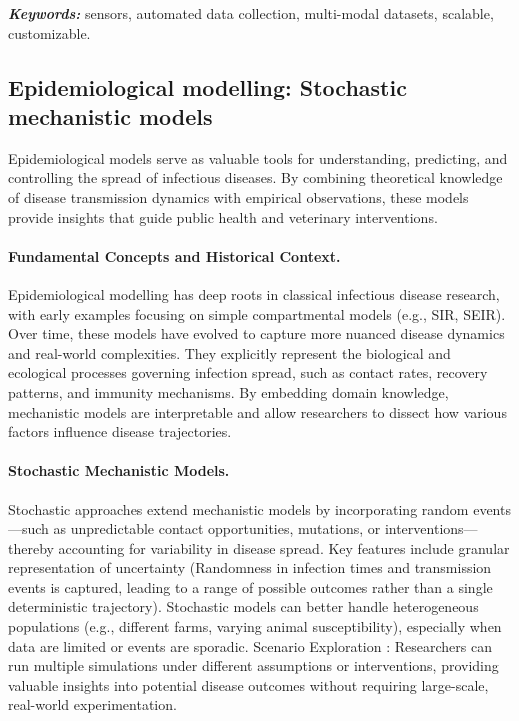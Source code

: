 \textit{\textbf{Keywords:}} sensors, automated data collection, multi-modal datasets, scalable, customizable.


\subsection{Epidemiological modelling: Stochastic mechanistic models}

Epidemiological models serve as valuable tools for understanding, predicting, and controlling the spread of infectious diseases. By combining theoretical knowledge of disease transmission dynamics with empirical observations, these models provide insights that guide public health and veterinary interventions.

\paragraph{Fundamental Concepts and Historical Context.} Epidemiological modelling has deep roots in classical infectious disease research, with early examples focusing on simple compartmental models (e.g., SIR, SEIR). Over time, these models have evolved to capture more nuanced disease dynamics and real-world complexities. They explicitly represent the biological and ecological processes governing infection spread, such as contact rates, recovery patterns, and immunity mechanisms. By embedding domain knowledge, mechanistic models are interpretable and allow researchers to dissect how various factors influence disease trajectories.

\paragraph{Stochastic Mechanistic Models.} Stochastic approaches extend mechanistic models by incorporating random events—such as unpredictable contact opportunities, mutations, or interventions—thereby accounting for variability in disease spread. Key features include granular representation of uncertainty (Randomness in infection times and transmission events is captured, leading to a range of possible outcomes rather than a single deterministic trajectory). Stochastic models can better handle heterogeneous populations (e.g., different farms, varying animal susceptibility), especially when data are limited or events are sporadic. Scenario Exploration : Researchers can run multiple simulations under different assumptions or interventions, providing valuable insights into potential disease outcomes without requiring large-scale, real-world experimentation.

